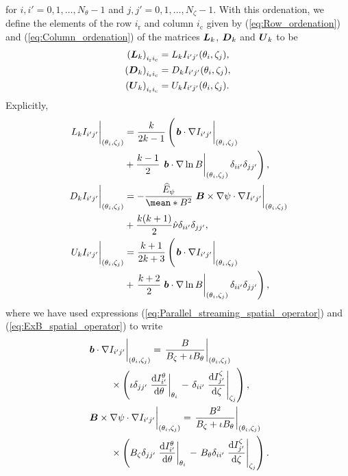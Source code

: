 \documentclass[10pt]{iopart}
\begin{document}
 for $i,i'=0,1,\ldots,N_\theta-1$ and  $j,j'=0,1,\ldots,N_\zeta-1$. With this ordenation, we define the elements of the row $i_{\text{r}}$ and column $i_{\text{c}}$ given by (\ref{eq:Row_ordenation}) and (\ref{eq:Column_ordenation}) of the matrices $\vb*{L}_k$, $\vb*{D}_k$ and $\vb*{U}_k$ to be 
 \begin{align}
 	\left(\vb*{L}_k\right)_{i_{\text{r}} i_{\text{c}}}
 	& =
 	{L_k I_{i'j'}}{(\theta_i,\zeta_j)},
 	\\
 	\left(\vb*{D}_k\right)_{i_{\text{r}} i_{\text{c}}}
 	& =
 	{D_k I_{i'j'}}{(\theta_i,\zeta_j)},
 	\\
 	\left(\vb*{U}_k\right)_{i_{\text{r}} i_{\text{c}}}
 	& =
 	{U_k I_{i'j'}}{(\theta_i,\zeta_j)}.
 \end{align}
 Explicitly,
 \begin{align}
 	\eval{L_k I_{i'j'}}_{(\theta_i,\zeta_j)}
 	& =
 	\frac{k}{2k-1} 
 	\left(
 	\eval{\vb*{b} \cdot \nabla I_{i'j'}}_{(\theta_i,\zeta_j)}
 	\nonumber
 	\right.
 	\\
 	&
 	+
 	\frac{k-1}{2}
 	\left.
 	\eval{\vb*{b}\cdot\nabla \ln B}_{(\theta_i,\zeta_j)}	
 	\delta_{ii'}\delta_{jj'}
 	\right)
 	,
 	\\
 	\eval{D_k I_{i'j'}}_{(\theta_i,\zeta_j)}
 	& =
 	-\frac{\widehat{E}_\psi}{\mean*{B^2}}
 	\eval{\vb*{B}\times \nabla\psi  \cdot \nabla 
 		I_{i'j'}}_{(\theta_i,\zeta_j)}
 	\nonumber \\
 	& +  
 	\frac{k(k+1)}{2}
 	\hat{\nu}\delta_{ii'}\delta_{jj'}
 	,
 	\\
 	\eval{U_k I_{i'j'}}_{(\theta_i,\zeta_j)}
 	& = 
 	\frac{k+1}{2k+3} 
 	\left(
 	\eval{\vb*{b} \cdot \nabla  I_{i'j'}}_{(\theta_i,\zeta_j) } 
 	\right. \nonumber
 	\\
 	& +
 	\left.
 	\frac{k+2}{2}
 	\eval{\vb*{b}\cdot\nabla \ln B}_{(\theta_i,\zeta_j)}	
 	\delta_{ii'}\delta_{jj'}
 	\right)
 	,
 \end{align}
 where we have used expressions (\ref{eq:Parallel_streaming_spatial_operator}) and (\ref{eq:ExB_spatial_operator}) to write
 \begin{align}
 	& \eval{\vb*{b} \cdot \nabla  I_{i'j'}}_{(\theta_i,\zeta_j) }
 	=
 	\eval{\frac{B}{B_\zeta + \iota B_\theta}}_{(\theta_i,\zeta_j)}
 	\nonumber\\
 	& \qquad \times
 	\left(
 	\iota 
 	\delta_{jj'}
 	\eval{\dv{I_{i'}^{\theta}}{\theta}}_{\theta_i}
 	\right.
 	-
 	\left.
 	\delta_{ii'}
 	\eval{\dv{I_{j'}^{\zeta}}{\zeta}}_{\zeta_j}
 	\right),
 	\\
 	& \eval{\vb*{B}\times \nabla\psi  \cdot \nabla 
 		I_{i'j'}}_{(\theta_i,\zeta_j)}
 	=
 	\eval{\frac{B^2}{B_\zeta + \iota B_\theta}}_{(\theta_i,\zeta_j)}
 	\nonumber \\ 
 	&
 	\qquad
 	\times\left(
 	B_\zeta 
 	\delta_{jj'}
 	\eval{\dv{I_{i'}^{\theta}}{\theta}}_{\theta_i}
 	\right. 
 	-
 	\left.
 	B_\theta 
 	\delta_{ii'}
 	\eval{\dv{I_{j'}^{\zeta}}{\zeta}}_{\zeta_j}
 	\right).
 \end{align}
\end{document}
